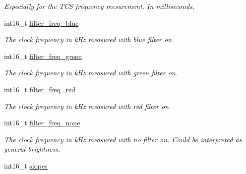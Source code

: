 \begin{CompactItemize}
\begin{CompactList}\small\item\em Especially for the TCS frequency mesurement. In milliseconds. \item\end{CompactList}\item 
\hypertarget{structcolor__sensor__tcs__t_932f2edbd620800cb115897b50537616}{
int16\_\-t \hyperlink{structcolor__sensor__tcs__t_932f2edbd620800cb115897b50537616}{filter\_\-freq\_\-blue}}
\label{structcolor__sensor__tcs__t_932f2edbd620800cb115897b50537616}

\begin{CompactList}\small\item\em The clock frequency in kHz measured with blue filter on. \item\end{CompactList}\item 
\hypertarget{structcolor__sensor__tcs__t_492b9a4317c14731f6a79d1b44372bcf}{
int16\_\-t \hyperlink{structcolor__sensor__tcs__t_492b9a4317c14731f6a79d1b44372bcf}{filter\_\-freq\_\-green}}
\label{structcolor__sensor__tcs__t_492b9a4317c14731f6a79d1b44372bcf}

\begin{CompactList}\small\item\em The clock frequency in kHz measured with green filter on. \item\end{CompactList}\item 
\hypertarget{structcolor__sensor__tcs__t_a82029dfdc10172be6206df50c80eb08}{
int16\_\-t \hyperlink{structcolor__sensor__tcs__t_a82029dfdc10172be6206df50c80eb08}{filter\_\-freq\_\-red}}
\label{structcolor__sensor__tcs__t_a82029dfdc10172be6206df50c80eb08}

\begin{CompactList}\small\item\em The clock frequency in kHz measured with red filter on. \item\end{CompactList}\item 
\hypertarget{structcolor__sensor__tcs__t_1960e5bd9f79595e67082119b3aaa15a}{
int16\_\-t \hyperlink{structcolor__sensor__tcs__t_1960e5bd9f79595e67082119b3aaa15a}{filter\_\-freq\_\-none}}
\label{structcolor__sensor__tcs__t_1960e5bd9f79595e67082119b3aaa15a}

\begin{CompactList}\small\item\em The clock frequency in kHz measured with no filter on. Could be interpreted as general brightness. \item\end{CompactList}\item 
\hypertarget{structcolor__sensor__tcs__t_747977dacfa4ab5d769ac72ad0db2ce6}{
int16\_\-t \hyperlink{structcolor__sensor__tcs__t_747977dacfa4ab5d769ac72ad0db2ce6}{slopes}}
\label{structcolor__sensor__tcs__t_747977dacfa4ab5d769ac72ad0db2ce6}


\end{CompactItemize}
